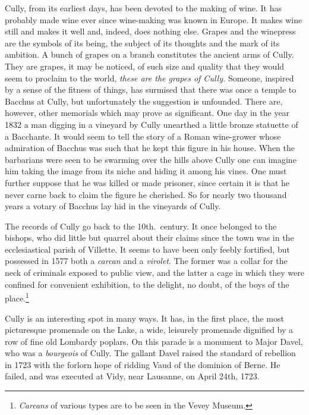 \documentclass[11pt,a4paper,twocolumn]{article}
\begin{document}
Cully, from its earliest days, has been devoted to the making of wine. It has
probably made wine ever since wine-making was known in Europe. It makes wine
still and makes it well and, indeed, does nothing else. Grapes and the
winepress are the symbols of its being, the subject of its thoughts and the
mark of its ambition. A bunch of grapes on a branch constitutes the ancient
arms of Cully. They are grapes, it may be noticed, of such size and quality
that they would seem to proclaim to the world, \emph{these are the grapes of
Cully.}  Someone, inspired by a sense of the fitness of things, has surmised
that there was once a temple to Bacchus at Cully, but unfortunately the
suggestion is unfounded. There are, however, other memorials which may prove
as significant. One day in the year 1832 a man digging in a vineyard by Cully
unearthed a little bronze statuette of a Bacchante. It would seem to tell the
story of a Roman wine-grower whose admiration of Bacchus was such that he
kept this figure in his house. When the barbarians were seen to be swarming
over the hills above Cully one can imagine him taking the image from its
niche and hiding it among his vines. One must further suppose that he was
killed or made prisoner, since certain it is that he never carne back to
claim the figure he cherished. So for nearly two thousand years a votary of
Bacchus lay hid in the vineyards of Cully.

The records of Cully go back to the 10th.\ century. It once belonged to the
bishops, who did little but quarrel about their claims since the town was in
the ecclesiastical parish of Villette. It seems to have been only feebly
fortified, but possessed in 1577 both a \emph{carcan} and a \emph{virolet}\@.
The former was a collar for the neck of criminals exposed to public view, and
the latter a cage in which they were confined for convenient exhibition, to
the delight, no doubt, of the boys of the place.\footnote{\emph{Carcans} of
various types are to be seen in the Vevey Museum.}


Cully is an interesting spot in many ways. It has, in the first place, the
most picturesque promenade on the Lake, a wide, leisurely promenade dignified
by a row of fine old Lombardy poplars. On this parade is a monument to
\mbox{Major} Davel, who was a \emph{bourgeois} of Cully. The gallant Davel
raised the standard of rebellion in 1723 with the forlorn hope of ridding
Vaud of the dominion of Berne. He failed, and was executed at Vidy, near
Lausanne, on April 24th, 1723.
\end{document}
